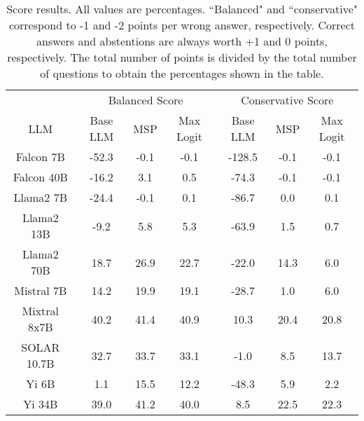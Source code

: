\begin{table*}
\centering
\begin{tabular}{c|c|c|c|c|c|c}
& \multicolumn{3}{c|}{Balanced Score} & \multicolumn{3}{c}{Conservative Score} \\ 
LLM & Base LLM & MSP & Max Logit & Base LLM & MSP & Max Logit\\ \hline
Falcon 7B & -52.3 & -0.1 & -0.1 & -128.5 & -0.1 & -0.1\\
Falcon 40B & -16.2 & 3.1 & 0.5 & -74.3 & -0.1 & -0.1\\
Llama2 7B & -24.4 & -0.1 & 0.1 & -86.7 & 0.0 & 0.1\\
Llama2 13B & -9.2 & 5.8 & 5.3 & -63.9 & 1.5 & 0.7\\
Llama2 70B & 18.7 & 26.9 & 22.7 & -22.0 & 14.3 & 6.0\\
Mistral 7B & 14.2 & 19.9 & 19.1 & -28.7 & 1.0 & 6.0\\
Mixtral 8x7B & 40.2 & 41.4 & 40.9 & 10.3 & 20.4 & 20.8\\
SOLAR 10.7B & 32.7 & 33.7 & 33.1 & -1.0 & 8.5 & 13.7\\
Yi 6B & 1.1 & 15.5 & 12.2 & -48.3 & 5.9 & 2.2\\
Yi 34B & 39.0 & 41.2 & 40.0 & 8.5 & 22.5 & 22.3\\
\hline
\end{tabular}
\caption{Score results. All values are percentages. ``Balanced" and ``conservative" correspond to -1 and -2 points per wrong answer, respectively. Correct answers and abstentions are always worth +1 and 0 points, respectively. The total number of points is divided by the total number of questions to obtain the percentages shown in the table.}
\label{tab:score}
\end{table*}

